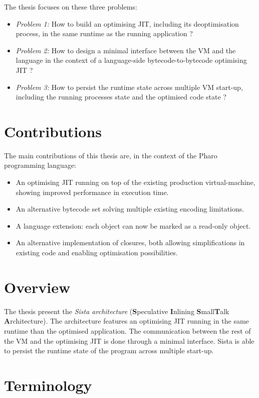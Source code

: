 \documentclass[a4paper,12pt,twoside]{../includes/ThesisStyle}
\begin{document}
The thesis focuses on these three problems:

\begin{itemize}
	\item \emph{Problem 1:} How to build an optimising JIT, including its deoptimisation process, in the same runtime as the running application ?
	\item \emph{Problem 2:} How to design a minimal interface between the VM and the language in the context of a language-side bytecode-to-bytecode optimising JIT ?
	\item \emph{Problem 3:} How to persist the runtime state across multiple VM start-up, including the running processes state and the optimised code state ?
\end{itemize}

\section{Contributions}

The main contributions of this thesis are, in the context of the Pharo programming language:
\begin{itemize}
	\item An optimising JIT running on top of the existing production virtual-machine, showing improved performance in execution time.
	\item An alternative bytecode set solving multiple existing encoding limitations.
	\item A language extension: each object can now be marked as a read-only object.
	\item An alternative implementation of closures, both allowing simplifications in existing code and enabling optimisation possibilities.
\end{itemize}

\section{Overview}

The thesis present the \emph{Sista architecture} (\textbf{S}peculative \textbf{I}nlining \textbf{S}mall\textbf{T}alk \textbf{A}rchitecture). The architecture features an optimising JIT running in the same runtime than the optimised application. The communication between the rest of the VM and the optimising JIT is done through a minimal interface. Sista is able to persist the runtime state of the program across multiple start-up.

\section{Terminology}
\end{document}
